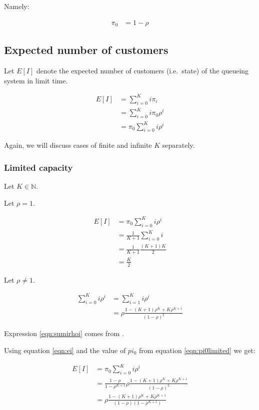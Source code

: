 \documentclass{article}
\begin{document}
Namely:

\begin{align}
\pi_0 &= 1 - \rho \label{eqn:pi0unlimited}
\end{align}

\subsection{Expected number of customers}

Let $E[I]$ denote the expected number of customers (i.e.~state)
of the queueing system in limit time.

\begin{align}
E[I] &= \sum_{i=0}^K{i \pi_i} \\
&= \sum_{i=0}^K{i \pi_0 \rho^i} \\
&= \pi_0 \sum_{i=0}^K{i \rho^i} \label{eqn:ei}
\end{align}

Again, we will discuss cases of finite and infinite $K$ separately.

\subsubsection{Limited capacity}

Let $K \in \mathbb{N}$.

Let $\rho = 1$.

\begin{align}
E[I] &= \pi_0 \sum_{i=0}^K{i \rho^i} \\
&= \frac{1}{K+1} \sum_{i=0}^K{i} \\
&= \frac{1}{K+1} \frac{(K+1)K}{2} \\
&= \frac{K}{2}
\end{align}

Let $\rho \neq 1$.

\begin{align}
\sum_{i=0}^K{i \rho^i}
&= \sum_{i=1}^K{i \rho^i} \\
&= \rho \frac{1 - (K+1) \rho^K + K \rho^{K+1}}{(1 - \rho)^2}
\label{eqn:sumirhoi}
\end{align}

Expression \ref{eqn:sumirhoi} comes from \cite[section Low-order polylogarithms]{wiki:series}.

Using equation \ref{eqn:ei} and the value of $pi_0$ from equation
\ref{eqn:pi0limited} we get:

\begin{align}
E[I]
&= \pi_0 \sum_{i=0}^K{i \rho^i} \\
&= \frac{1 - \rho}{1 - \rho^{K+1}}
\rho \frac{1 - (K+1) \rho^K + K \rho^{K+1}}{(1 - \rho)^2} \\
&= \rho \frac{1 - (K+1) \rho^K + K \rho^{K+1}}{(1 - \rho)(1 - \rho^{K+1})}
\end{align}
\end{document}
